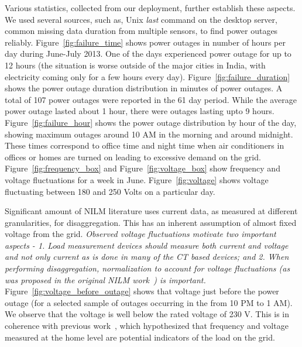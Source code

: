 \documentclass[10pt]{sensys-proc}
\newcommand{\redcolor}[1]{\textcolor{red}{#1}}
\newcommand{\figref}[1]{Figure~\ref{#1}}
\begin{document}
Various statistics, collected from our deployment, further establish these aspects. We used several sources, such as, Unix \emph{last} command on the desktop server, common missing data duration from multiple sensors, to find power outages reliably. \figref{fig:failure_time} shows power outages in number of hours per day during June-July 2013. One of the days experienced power outage for up to 12 hours (the situation is worse outside of the major cities in India, with electricity coming only for a few hours every day). \figref{fig:failure_duration} shows the power outage duration distribution in minutes of power outages. A total of 107 power outages were reported in the 61 day period. While the average power outage lasted about 1 hour, there were outages lasting upto 9 hours. \figref{fig:failure_hour} shows the power outage distribution by hour of the day, showing maximum outages around 10 AM in the morning and around midnight. These times correspond to office time and night time when air conditioners in offices or homes are turned on leading to excessive demand on the grid. \figref{fig:frequency_box} and \figref{fig:voltage_box} show frequency and voltage fluctuations for a week in June. \figref{fig:voltage} shows voltage fluctuating between 180 and 250 Volts on a particular day.

Significant amount of NILM literature uses current data, as measured at different granularities, for disaggregation. This has an inherent assumption of almost fixed voltage from the grid. \emph{Observed voltage fluctuations motivate two important aspects - 1. Load measurement devices should measure both current and voltage and not only current as is done in many of the CT based devices; and 2. When performing disaggregation, normalization to account for voltage fluctuations (as was proposed in the original NILM work~\cite{hart}) is important.}
\figref{fig:voltage_before_outage} shows that voltage just before the power outage (for a selected sample of outages occurring in the  from 10 PM to 1 AM). We observe that the voltage is well below the rated voltage of 230 V. This is in coherence with previous work~\cite{nplug}, which hypothesized that frequency and voltage measured at the home level are potential indicators of the load on the grid.
\end{document}
